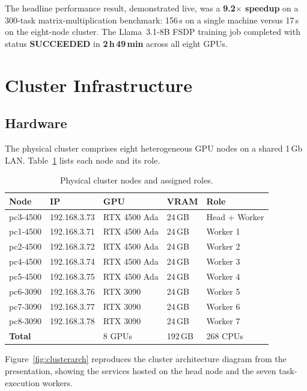 \documentclass[12pt,a4paper]{article}
\begin{document}
The headline performance result, demonstrated live, was a
\textbf{9.2$\times$ speedup} on a 300-task matrix-multiplication
benchmark: 156\,s on a single machine versus 17\,s on the eight-node
cluster. The Llama~3.1-8B FSDP training job completed with status
\textbf{SUCCEEDED} in \textbf{2\,h\,49\,min} across all eight GPUs.

\section{Cluster Infrastructure}

\subsection{Hardware}

The physical cluster comprises eight heterogeneous GPU nodes on a shared
1\,Gb LAN. Table~\ref{tab:nodes} lists each node and its role.

\begin{table}[H]
\centering
\caption{Physical cluster nodes and assigned roles.}
\label{tab:nodes}
\begin{tabular}{lllll}
\toprule
\textbf{Node} & \textbf{IP} & \textbf{GPU} & \textbf{VRAM} & \textbf{Role} \\
\midrule
pc3-4500 & 192.168.3.73 & RTX 4500 Ada & 24\,GB & Head + Worker \\
pc1-4500 & 192.168.3.71 & RTX 4500 Ada & 24\,GB & Worker 1 \\
pc2-4500 & 192.168.3.72 & RTX 4500 Ada & 24\,GB & Worker 2 \\
pc4-4500 & 192.168.3.74 & RTX 4500 Ada & 24\,GB & Worker 3 \\
pc5-4500 & 192.168.3.75 & RTX 4500 Ada & 24\,GB & Worker 4 \\
pc6-3090 & 192.168.3.76 & RTX 3090     & 24\,GB & Worker 5 \\
pc7-3090 & 192.168.3.77 & RTX 3090     & 24\,GB & Worker 6 \\
pc8-3090 & 192.168.3.78 & RTX 3090     & 24\,GB & Worker 7 \\
\midrule
\multicolumn{2}{l}{\textbf{Total}} & 8 GPUs & 192\,GB & 268 CPUs \\
\bottomrule
\end{tabular}
\end{table}

Figure~\ref{fig:clusterarch} reproduces the cluster architecture diagram
from the presentation, showing the services hosted on the head node and
the seven task-execution workers.
\end{document}
